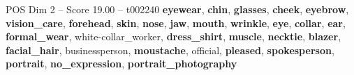 \begin{textsample}{POS Dim 2 – Score 19.00 – t002240}  \label{ex:f2_pos_038}
\textbf{eyewear}, \textbf{chin}, \textbf{glasses}, \textbf{cheek}, \textbf{eyebrow}, \textbf{vision\_care}, \textbf{forehead}, \textbf{skin}, \textbf{nose}, \textbf{jaw}, \textbf{mouth}, \textbf{wrinkle}, \textbf{eye}, \textbf{collar}, \textbf{ear}, \textbf{formal\_wear}, white-collar\_worker, \textbf{dress\_shirt}, \textbf{muscle}, \textbf{necktie}, \textbf{blazer}, \textbf{facial\_hair}, businessperson, \textbf{moustache}, official, \textbf{pleased}, \textbf{spokesperson}, \textbf{portrait}, \textbf{no\_expression}, \textbf{portrait\_photography}

\end{textsample}
